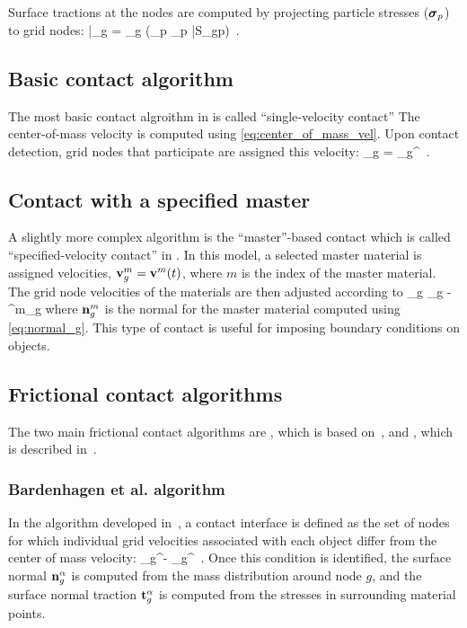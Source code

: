 Surface tractions at the nodes are computed by projecting particle stresses ($\boldsymbol{\sigma}_p$) to grid nodes:
\Beq
  \bar{\Bt}_g = \Bn_g \cdot \left(\sum_p \Bsig_p \bar{S}_{gp}\right) \,.
\Eeq

\subsection{Basic contact algorithm}
The most basic contact algroithm in \Vaango is called ``single-velocity contact''  The center-of-mass
velocity is computed using \eqref{eq:center_of_mass_vel}.  Upon contact detection, grid nodes
that participate are assigned this velocity:
\Beq
   \Bv_g = \Bv_g^{\Tcm} \,.
\Eeq

\subsection{Contact with a specified master}
A slightly more complex algorithm is the ``master''-based contact which is called
``specified-velocity contact'' in \Vaango.  In this model, a selected master material is
assigned velocities, $\mathbf{v}_g^m = \mathbf{v}^m(t)$, where $m$ is the index of the master material.
The grid node velocities of the materials are then adjusted according to
\Beq
  \Bv_g \leftarrow \Bv_g -  \Bn^m_g 
\Eeq
where $\mathbf{n}^m_g$ is the normal for the master material computed using \eqref{eq:normal_g}.
This type of contact is useful for imposing boundary conditions on objects.

\subsection{Frictional contact algorithms}
The two main frictional contact algorithms
are , which is based on~\cite{Bard2001}, and ,
which is described in~\cite{Nairn2020}.


\subsubsection{Bardenhagen et al. algorithm}
In the algorithm developed in~\cite{Bard2001}, a contact interface is defined as the set of
nodes for which individual grid velocities associated with each object differ from the
center of mass velocity:
\Beq
  \Bv_g^\alpha - \Bv_g^\Tcm {} \,.
\Eeq
Once this condition is identified, the surface normal $\mathbf{n}_g^\alpha$ is computed
from the mass distribution around node $g$, and the surface normal traction
$\mathbf{t}_g^\alpha$ is computed from the stresses in surrounding material points.

